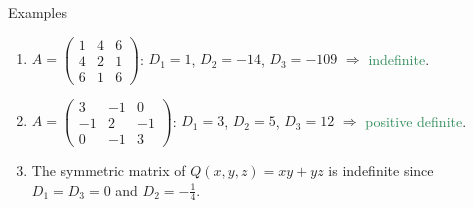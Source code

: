 \documentclass[11pt,aspectratio=169]{beamer}
\begin{document}
\begin{frame}{Examples}
 
\begin{enumerate}
\item
$
A=\begin{pmatrix}1&4&6\\ 4&2&1\\ 6&1&6\end{pmatrix}
$:
$D_1=1$, $D_2=-14$, $D_3=-109$ $\Rightarrow$ \textcolor{SeaGreen}{indefinite}.
\item
$
A=\begin{pmatrix}3&-1&0\\ -1&2&-1\\ 0&-1&3\end{pmatrix}
$:
$D_1=3$, $D_2=5$, $D_3=12$ $\Rightarrow$ \textcolor{SeaGreen}{positive definite}.
\item The symmetric matrix of $Q(x,y,z)=xy+yz$ is indefinite since $D_1=D_3=0$ and $D_2=-\tfrac14$.
\end{enumerate}
 
\end{frame}
\end{document}
